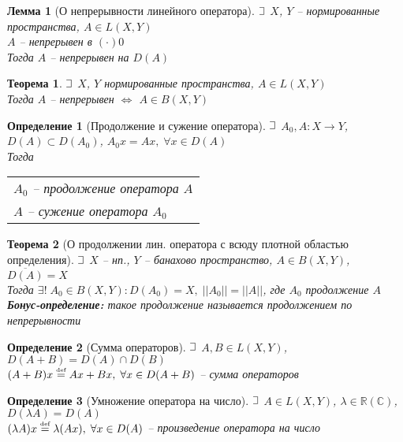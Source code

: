 \documentclass{article}
\theoremstyle{truestyle}
\newtheorem*{defenition}{Определение}
\newtheorem*{theorem}{Теорема}
\newtheorem*{lemma}{Лемма}
\newcommand{\eqdef}{\overset{\text{\tiny def}}=}
\def\letus{%
	\mathord{\setbox0=\hbox{$\exists$}%
		\hbox{\kern 0.125\wd0%
			\vbox to \ht0{%
				\hrule width 0.75\wd0%
				\vfill%
				\hrule width 0.75\wd0}%
			\vrule height \ht0%
			\kern 0.125\wd0}%
	}%
}
\begin{document}
\begin{lemma}[О непрерывности линейного оператора]
  $\letus$ $X$, $Y$ -- нормированные пространства,
  $A \in L(X, Y)$ \\
  $A$ -- непрерывен в $(\cdot) 0$ \\
  Тогда $A$ -- непрерывен на $D(A)$
\end{lemma}

\begin{theorem}
  $\letus$ $X$, $Y$ нормированные пространства, $A \in L(X, Y)$\\
  Тогда $A$ -- непрерывен $\Longleftrightarrow$ $A \in B(X, Y)$
\end{theorem}

\begin{defenition}[Продолжение и сужение оператора]
  $\letus$ $A_0, A: X \longrightarrow Y$, $D(A) \subset D(A_0)$, $A_0x=Ax, \; \forall x \in D(A)$\\
  Тогда 
  \begin{tabular}[t]{l}
    $A_0$ -- продолжение оператора $A$\\
    $A$ -- сужение оператора $A_0$
  \end{tabular}
\end{defenition}

\begin{theorem}[О продолжении лин. оператора с всюду плотной областью определения]
  $\letus$ $X$ -- нп., $Y$ -- банахово пространство, $A \in B(X, Y)$, $\overline{D(A)} = X$\\
  Тогда $\exists! \; A_0 \in B(X, Y): D(A_0) = X, \; ||A_0|| = ||A||$, где $A_0$ продолжение $A$\\
  {\bf Бонус-определение:} такое продолжение называется продолжением по непрерывности
\end{theorem}

\begin{defenition}[Сумма операторов]
  $\letus$ $A, B \in L(X, Y)$, $D(A + B) = D(A) \cap D(B)$\\
  $(A+B)x \eqdef Ax + Bx, \; \forall x \in D(A+B)$ -- сумма операторов 
\end{defenition}

\begin{defenition}[Умножение оператора на число]
  $\letus$ $A \in L(X, Y)$, $\lambda \in \mathbb{R}(\mathbb{C})$, $D(\lambda A) = D(A)$\\
  $(\lambda A)x \eqdef \lambda(Ax), \; \forall x \in D(A)$ -- произведение оператора на число 
\end{defenition}
\end{document}
